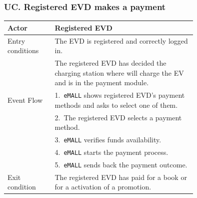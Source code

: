 \begin{center}
\end{center}

\subsubsection*{UC\cuc . Registered EVD makes a payment}
\begin{center}
    \begin{longtable}{lp{0.75\linewidth}}
        \hline
        Actor            & Registered EVD                                                                                                        \\
        \hline
        Entry conditions & The EVD is registered and correctly logged in.                                                                        \\
        & The registered EVD has decided the charging station where will charge the EV and is in the payment module.            \\
        \hline
        Event Flow       & 1.\ \verb|eMALL| shows registered EVD's payment methods and asks to select one of them.                                      \\
        & 2.\ The registered EVD selects a payment method.                                                                      \\
        & 3.\ \verb|eMALL| verifies funds availability.                                                                                \\
        & 4.\ \verb|eMALL| starts the payment process.                                                                                 \\
        & 5.\ \verb|eMALL| sends back the payment outcome.                                                                             \\
        \hline
        Exit condition   & The registered EVD has paid for a book or for a activation of a promotion.                                            \\

\end{longtable}
\end{center}
